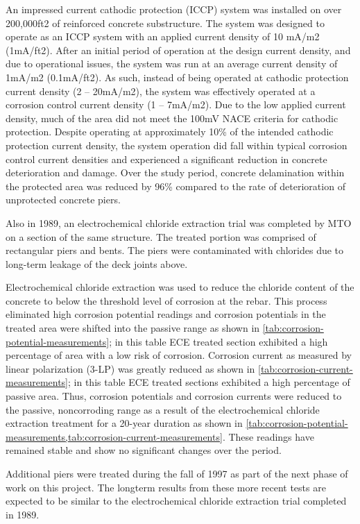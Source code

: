 An impressed current cathodic protection (ICCP) system was installed on over 200,000ft2 of reinforced concrete substructure. The system was designed to operate as an ICCP system with an applied current density of 10 mA/m2 (1mA/ft2). After an initial period of operation at the design current density, and due to operational issues, the system was run at an average current density of 1mA/m2 (0.1mA/ft2). As such, instead of being operated at cathodic protection current density (2 – 20mA/m2), the system was effectively operated at a corrosion control current density (1 – 7mA/m2). Due to the low applied current density, much of the area did not meet the 100mV NACE criteria for cathodic protection. Despite operating at approximately 10\% of the intended cathodic protection current density, the system operation did fall within typical corrosion control current densities and experienced a significant reduction in concrete deterioration and damage. Over the study period, concrete delamination within the protected area was reduced by 96\% compared to the rate of deterioration of unprotected concrete piers.

Also in 1989, an electrochemical chloride extraction trial was completed by MTO on a section of the same structure. The treated portion was comprised of rectangular piers and bents. The piers were contaminated with chlorides due to long-term leakage of the deck joints above.

Electrochemical chloride extraction was used to reduce the chloride content of the concrete to below the threshold level of corrosion at the rebar. This process eliminated high corrosion potential readings and corrosion potentials in the treated area were shifted into the passive range as shown in \cref{tab:corrosion-potential-measurements}; in this table ECE treated section exhibited a high percentage of area with a low risk of corrosion. Corrosion current as measured by linear polarization (3-LP) was greatly reduced as shown in \cref{tab:corrosion-current-measurements}; in this table ECE treated sections exhibited a high percentage of passive area. Thus, corrosion potentials and corrosion currents were reduced to the passive, noncorroding range as a result of the electrochemical chloride extraction treatment for a 20-year duration as shown in \cref{tab:corrosion-potential-measurements,tab:corrosion-current-measurements}. These readings have remained stable and show no significant changes over the period.

Additional piers were treated during the fall of 1997 as part of the next phase of work on this project. The longterm results from these more recent tests are expected to be similar to the electrochemical chloride extraction trial completed in 1989.

